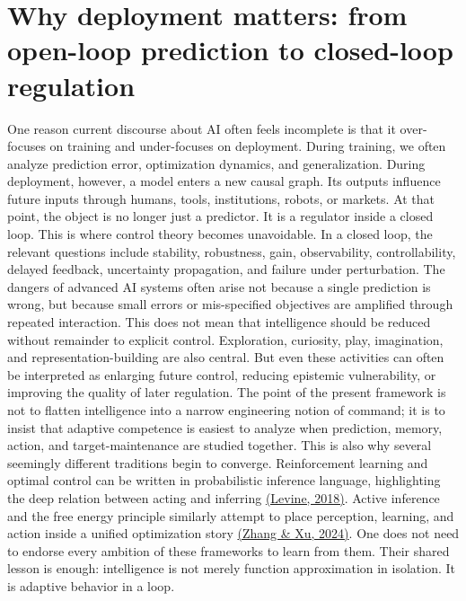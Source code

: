 \documentclass[11pt]{article}
\newcommand{\citejump}[2]{\hyperref[#1]{(#2)}}
\begin{document}
\section{Why deployment matters: from open-loop prediction to closed-loop regulation}
One reason current discourse about AI often feels incomplete is that it over-focuses on training and under-focuses on deployment. During training, we often analyze prediction error, optimization dynamics, and generalization. During deployment, however, a model enters a new causal graph. Its outputs influence future inputs through humans, tools, institutions, robots, or markets. At that point, the object is no longer just a predictor. It is a regulator inside a closed loop. This is where control theory becomes unavoidable. In a closed loop, the relevant questions include stability, robustness, gain, observability, controllability, delayed feedback, uncertainty propagation, and failure under perturbation. The dangers of advanced AI systems often arise not because a single prediction is wrong, but because small errors or mis-specified objectives are amplified through repeated interaction. This does not mean that intelligence should be reduced without remainder to explicit control. Exploration, curiosity, play, imagination, and representation-building are also central. But even these activities can often be interpreted as enlarging future control, reducing epistemic vulnerability, or improving the quality of later regulation. The point of the present framework is not to flatten intelligence into a narrow engineering notion of command; it is to insist that adaptive competence is easiest to analyze when prediction, memory, action, and target-maintenance are studied together.
This is also why several seemingly different traditions begin to converge. Reinforcement learning and optimal control can be written in probabilistic inference language, highlighting the deep relation between acting and inferring \citejump{ref:levine2018}{Levine, 2018}. Active inference and the free energy principle similarly attempt to place perception, learning, and action inside a unified optimization story \citejump{ref:zhang2024}{Zhang \& Xu, 2024}. One does not need to endorse every ambition of these frameworks to learn from them. Their shared lesson is enough: intelligence is not merely function approximation in isolation. It is adaptive behavior in a loop.
\end{document}
